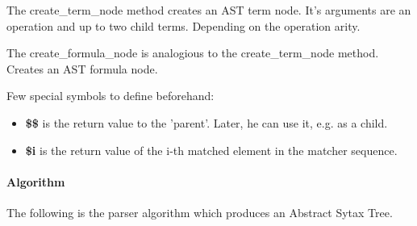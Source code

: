 \documentclass{article}
\begin{document}
			The create\_term\_node method creates an AST term node. It's arguments are an operation and up to two child terms. Depending on the operation arity.

			The create\_formula\_node is analogious to the create\_term\_node method. Creates an AST formula node.

			Few special symbols to define beforehand:
			\begin{itemize}
				\item \textbf{\$\$} is the return value to the 'parent'. Later, he can use it, e.g. as a child.
				\item \textbf{\$i} is the return value of the i-th matched element in the matcher sequence.
			\end{itemize}

		\paragraph{Algorithm} The following is the parser algorithm which produces an Abstract Sytax Tree.
\end{document}
